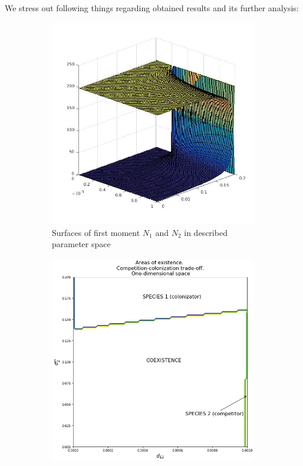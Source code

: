 \documentclass[%
 aip,
rsi,%
 amsmath,amssymb,
 reprint,%
]{revtex4-1}
\begin{document}
We stress out following things regarding obtained results and its further analysis:

\begin{figure}
\centering
\begin{subfigure}{.5\textwidth}
  \centering
  \includegraphics[width=.95\linewidth]{N1N2cctoD1.jpg}
  \caption{Surfaces of first moment \(N_1\) and \(N_2\) in described parameter space}
  \label{fig:cctod1:sub1}
\end{subfigure}%
\begin{subfigure}{.5\textwidth}
  \centering
  \includegraphics[width=.95\linewidth]{arccto08d1.png}

\end{subfigure}
\end{figure}
\end{document}

